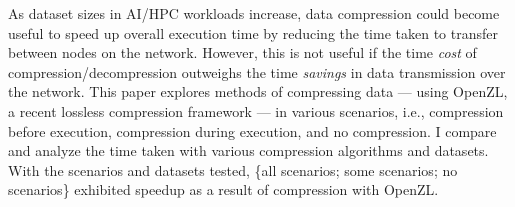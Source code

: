 As dataset sizes in AI/HPC workloads increase, data compression could become
useful to speed up overall execution time by reducing the time taken to transfer
between nodes on the network. However, this is not useful if the time
\emph{cost} of compression/decompression outweighs the time \emph{savings} in
data transmission over the network. This paper explores methods of compressing
data --- using OpenZL, a recent lossless compression framework --- in various
scenarios, i.e., compression before execution, compression during execution, and
no compression. I compare and analyze the time taken with various compression
algorithms and datasets. With the scenarios and datasets tested, \{all
scenarios; some scenarios; no scenarios\} exhibited speedup as a result of
compression with OpenZL.
